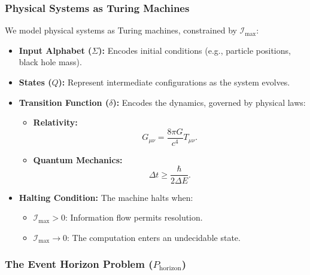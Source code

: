 \documentclass[12pt]{article}
\begin{document}
\subsubsection{Physical Systems as Turing Machines}

We model physical systems as Turing machines, constrained by $\mathcal{I}_{\text{max}}$:
\begin{itemize}
    \item \textbf{Input Alphabet ($\Sigma$):}
    Encodes initial conditions (e.g., particle positions, black hole mass).
    \item \textbf{States ($Q$):}
    Represent intermediate configurations as the system evolves.
    \item \textbf{Transition Function ($\delta$):}
    Encodes the dynamics, governed by physical laws:
    \begin{itemize}
        \item \textbf{Relativity:}
        \[
        G_{\mu\nu} = \frac{8 \pi G}{c^4} T_{\mu\nu}.
        \]
        \item \textbf{Quantum Mechanics:}
        \[
        \Delta t \geq \frac{\hbar}{2 \Delta E}.
        \]
    \end{itemize}
    \item \textbf{Halting Condition:}
    The machine halts when:
    \begin{itemize}
        \item $\mathcal{I}_{\text{max}} > 0$: Information flow permits resolution.
        \item $\mathcal{I}_{\text{max}} \to 0$: The computation enters an undecidable state.
    \end{itemize}
\end{itemize}

\subsubsection{The Event Horizon Problem ($P_{\text{horizon}}$)}
\end{document}
